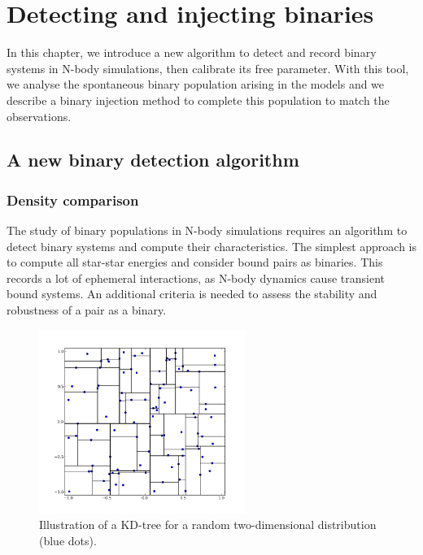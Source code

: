 
\chapter{Detecting and injecting binaries}
\label{Chap:BinAlgo}

In this chapter, we introduce a new algorithm to detect and record binary systems in N-body simulations, then calibrate its free parameter. With this tool, we analyse the spontaneous binary population arising in the \HubLem models and we describe a binary injection method to complete this population to match the observations.


\minitoc

\section{A new binary detection algorithm}


\subsection{Density comparison}

The study of binary populations in N-body simulations requires an algorithm to detect binary systems and compute their characteristics. The simplest approach is to compute all star-star energies and consider bound pairs as binaries. This records a lot of ephemeral interactions, as N-body dynamics cause transient bound systems. An additional criteria is needed to assess the stability and robustness of a pair as a binary.

\begin{figure}
\begin{center}
\includegraphics[width=0.6\textwidth]{Figures/5_kdtree}
\caption[Illustration of a KD-tree]{Illustration of a KD-tree for a random two-dimensional distribution (blue dots).}
\label{Fig:5_kdtree}
\end{center}
\end{figure}


